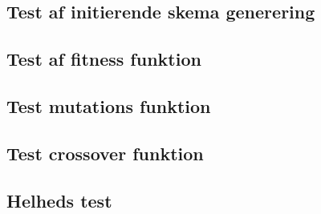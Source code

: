 \subsection{Test af initierende skema generering}
  

\subsection{Test af fitness funktion}
  

\subsection{Test mutations funktion}
  

\subsection{Test crossover funktion}
  

\subsection{Helheds test}
  

